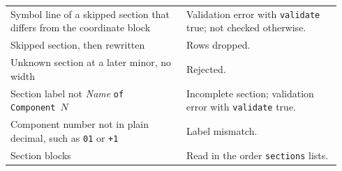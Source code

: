 \documentclass[preprint,12pt]{elsarticle}
\begin{document}
\begin{table}[tbp]
\begin{tabular}{@{}p{0.50\linewidth}p{0.44\linewidth}@{}}
Symbol line of a skipped section that differs from the coordinate block & Validation error with \texttt{validate} true; not checked otherwise. \\
Skipped section, then rewritten & Rows dropped. \\
Unknown section at a later minor, no width & Rejected. \\
Section label not \emph{Name} \texttt{of Component}~\(N\) & Incomplete section; validation error with \texttt{validate} true. \\
Component number not in plain decimal, such as \texttt{01} or \texttt{+1} & Label mismatch. \\
Section blocks & Read in the order \texttt{sections} lists. \\
\bottomrule
\end{tabular}
\end{table}
\end{document}
